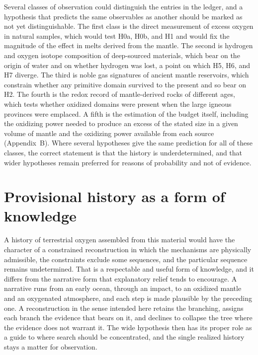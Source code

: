 \documentclass[11pt]{article}
\begin{document}
Several classes of observation could distinguish the entries in the ledger, and a hypothesis that predicts the same observables as another should be marked as not yet distinguishable. The first class is the direct measurement of excess oxygen in natural samples, which would test H0a, H0b, and H1 and would fix the magnitude of the effect in melts derived from the mantle. The second is hydrogen and oxygen isotope composition of deep-sourced materials, which bear on the origin of water and on whether hydrogen was lost, a point on which H5, H6, and H7 diverge. The third is noble gas signatures of ancient mantle reservoirs, which constrain whether any primitive domain survived to the present and so bear on H2. The fourth is the redox record of mantle-derived rocks of different ages, which tests whether oxidized domains were present when the large igneous provinces were emplaced. A fifth is the estimation of the budget itself, including the oxidizing power needed to produce an excess of the stated size in a given volume of mantle and the oxidizing power available from each source (Appendix~B). Where several hypotheses give the same prediction for all of these classes, the correct statement is that the history is underdetermined, and that wider hypotheses remain preferred for reasons of probability and not of evidence.

\section{Provisional history as a form of knowledge}

A history of terrestrial oxygen assembled from this material would have the character of a constrained reconstruction in which the mechanisms are physically admissible, the constraints exclude some sequences, and the particular sequence remains undetermined. That is a respectable and useful form of knowledge, and it differs from the narrative form that explanatory relief tends to encourage. A narrative runs from an early ocean, through an impact, to an oxidized mantle and an oxygenated atmosphere, and each step is made plausible by the preceding one. A reconstruction in the sense intended here retains the branching, assigns each branch the evidence that bears on it, and declines to collapse the tree where the evidence does not warrant it. The wide hypothesis then has its proper role as a guide to where search should be concentrated, and the single realized history stays a matter for observation.
\end{document}

